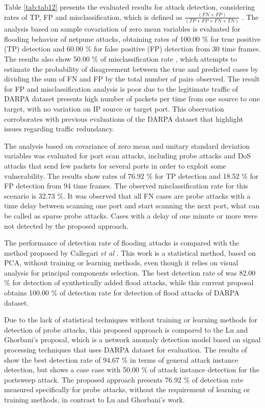 \documentclass[review]{elsarticle}
\begin{document}
Table \ref{tab:tab12} presents the evaluated results for attack detection, considering rates of TP, FP \cite{fleiss2013statistical} and misclassification, which is defined as $\frac{(FN+FP)}{(TP+FP+FN+TN)}$ \cite{bhuyan2014network}. The analysis based on sample covariation of zero mean variables is evaluated for flooding behavior of netpune attacks, obtaining rates of 100.00 \% for true positive (TP) detection and 60.00 \% for false positive (FP) detection from 30 time frames. The results also show 50.00 \% of misclassification rate , which attempts to estimate the probability of disagreement between the true and predicted cases by dividing the sum of FN and FP by the total number of pairs observed. 
The result for FP and misclassification analysis is poor due to the legitimate traffic of DARPA dataset presents high number of packets per time  from one source to one target, with no variation on IP source or target port. This observation corroborates with previous evaluations of the DARPA dataset that highlight issues regarding traffic redundancy. 

The analysis based on covariance of zero mean and unitary standard deviation variables was evaluated for port scan attacks, including probe attacks and DoS attacks that send few packets for several ports in order to exploit some vulnerability. The results show rates of 76.92 \% for TP detection and 18.52 \% for FP detection from 94 time frames. The observed misclassification rate for this scenario is 32.73 \%. It was observed that all FN cases are probe attacks with a time delay between scanning one port and start scanning the next port, what can be called as sparse probe attacks. Cases with a delay of one minute or more were not detected by the proposed approach.

The performance of detection rate of flooding attacks is compared with the method proposed by Callegari \emph{et al} \cite{Zonglin2009}. This work is a statistical method, based on PCA, without training or learning methods, even though it relies on visual analysis for principal components selection. The best detection rate of \cite{Zonglin2009} was 82.00 \% for detection of synthetically added flood attacks, while this current proposal obtains 100.00 \% of detection rate for detection of flood attacks of DARPA dataset.

Due to the lack of statistical techniques without training or learning methods for detection of probe attacks, this proposed approach is compared to the Lu and Ghorbani's \cite{Lu2009} proposal, which is a network anomaly detection model based on signal processing techniques that uses DARPA dataset for evaluation. The results of \cite{Lu2009} show the best detection rate of 94.67 \% in terms of general attack instance detection, but shows a case case with 50.00 \% of attack instance detection for the portsweep attack. The proposed approach presents 76.92 \% of detection rate measured specifically for probe attacks, without the requirement of learning or training methods, in contrast to Lu and Ghorbani's \cite{Lu2009} work.
\end{document}
